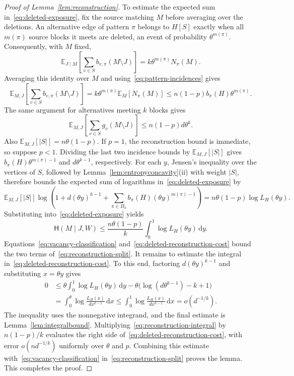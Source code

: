 \documentclass[11pt,reqno]{amsart}
\numberwithin{equation}{section}
\theoremstyle{plain}
\theoremstyle{definition}
\newcommand{\E}{\mathbb E}
\newcommand{\HH}{\mathsf H}
\newcommand{\dd}{\,\mathrm d}
\begin{document}
\begin{proof}[Proof of Lemma~\ref{lem:reconstruction}]
    To estimate the expected sum in~\eqref{eq:deleted-exposure}, fix the source matching $M$ before averaging over the deletions.
    An alternative edge of pattern $\pi$ belongs to $H[S]$ exactly when all $m(\pi)$ source blocks it meets are deleted, an event of probability $\theta^{m(\pi)}$.
    Consequently, with $M$ fixed,
    \[
        \E_{J\mid M}\left[\sum_{v\in S}b_{v,\pi}(M\setminus J)\right]
        =k\theta^{m(\pi)}N_\pi(M).
    \]
    Averaging this identity over $M$ and using~\eqref{eq:pattern-incidences} gives
    \[
        \E_{M,J}\left[\sum_{v\in S}b_{v,\pi}(M\setminus J)\right]
        =k\theta^{m(\pi)}\E_M[N_\pi(M)]
        \le n(1-p)b_\pi(H)\theta^{m(\pi)}.
    \]
    The same argument for alternatives meeting $k$ blocks gives
    \[
        \E_{M,J}\left[\sum_{v\in S}g_v(M\setminus J)\right]
        \le n(1-p)d\theta^k.
    \]
    Also $\E_{M,J}[|S|]=n\theta(1-p)$.
    If $p=1$, the reconstruction bound is immediate, so suppose $p<1$.
    Dividing the last two incidence bounds by $\E_{M,J}[|S|]$ gives $b_\pi(H)\theta^{m(\pi)-1}$ and $d\theta^{k-1}$, respectively.
    For each $y$, Jensen's inequality over the vertices of $S$, followed by Lemma~\ref{lem:entropyconcavity}(ii) with weight $|S|$, therefore bounds the expected sum of logarithms in~\eqref{eq:deleted-exposure} by
    \[
        \E_{M,J}[|S|]\log\left(1+d(\theta y)^{k-1}
        +\sum_{\pi\in\Pi_k}b_\pi(H)(\theta y)^{m(\pi)-1}\right)
        =n\theta(1-p)\log L_H(\theta y).
    \]
    Substituting into~\eqref{eq:deleted-exposure} yields
    \begin{equation}\label{eq:deleted-reconstruction-cost}
        \HH(M\mid J,W)\le\frac{n\theta(1-p)}k\int_0^1\log L_H(\theta y)\dd y.
    \end{equation}
    Equations~\eqref{eq:vacancy-classification} and~\eqref{eq:deleted-reconstruction-cost} bound the two terms of~\eqref{eq:reconstruction-split}. It remains to estimate the integral in~\eqref{eq:deleted-reconstruction-cost}.
    To this end, factoring $d(\theta y)^{k-1}$ and substituting $x=\theta y$ gives
    \begin{equation}\label{eq:reconstruction-integral}
        \begin{aligned}
            0&\le\theta\int_0^1\log L_H(\theta y)\dd y
            -\theta\bigl(\log(d\theta^{k-1})-k+1\bigr)\\
            &=\int_0^\theta\log\frac{L_H(x)}{dx^{k-1}}\dd x
            \le\int_0^1\log\frac{L_H(x)}{dx^{k-1}}\dd x
            =o(d^{-1/k}).
        \end{aligned}
    \end{equation}
    The inequality uses the nonnegative integrand, and the final estimate is Lemma~\ref{lem:integralbound}.
    Multiplying~\eqref{eq:reconstruction-integral} by $n(1-p)/k$ evaluates the right side of~\eqref{eq:deleted-reconstruction-cost}, with error $o(nd^{-1/k})$ uniformly over $\theta$ and $p$.
    Combining this estimate with~\eqref{eq:vacancy-classification} in~\eqref{eq:reconstruction-split} proves the lemma.
    This completes the proof.
\end{proof}
\end{document}
